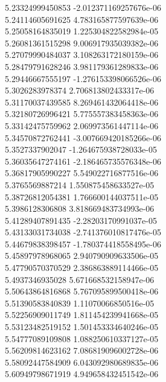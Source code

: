 {5.23324999450853 -2.012371169257676e-06
 \\
5.24114605691625 4.783165877597639e-06
 \\
5.25058164835019 1.225304822582984e-05
 \\
5.26081361515298 9.006917935039382e-06
 \\
5.27079990484037 3.108263172180159e-06
 \\
5.28479791628246 3.981179361289833e-06
 \\
5.29446667555197 -1.276153398066526e-06
 \\
5.3026283978374 2.706813802433317e-06
 \\
5.31170037439585 8.269461432064418e-06
 \\
5.32180726996421 5.775557383458363e-06
 \\
5.33142475759962 2.069973561447114e-06
 \\
5.34570872762441 -3.007669420185266e-06
 \\
5.3527337902047 -1.264675938728033e-05
 \\
5.36035647274161 -2.186465735576348e-06
 \\
5.36817905990227 5.549022716877516e-06
 \\
5.3765569887214 1.550875458633527e-05
 \\
5.38726812054381 1.766600144037511e-05
 \\
5.3986128306808 3.818669483734993e-06
 \\
5.41289407891435 -2.28203170991037e-05
 \\
5.43133031734038 -2.741376010817476e-05
 \\
5.44679838398457 -1.780374418558495e-06
 \\
5.45897978968065 2.940790909633506e-05
 \\
5.47790570370529 2.386863889114466e-05
 \\
5.4937346935028 5.671668532158947e-06
 \\
5.50643864816868 5.767095899500418e-06
 \\
5.51390583840839 1.11070066850516e-05
 \\
5.52256909011749 1.811454239941668e-05
 \\
5.53123482519152 1.501453334640246e-05
 \\
5.54777089109808 1.088250610337127e-05
 \\
5.56209814623162 7.086819096002728e-06
 \\
5.58092447584909 6.043092980689835e-06
 \\
5.60949798671919 4.949658432451542e-06
}
